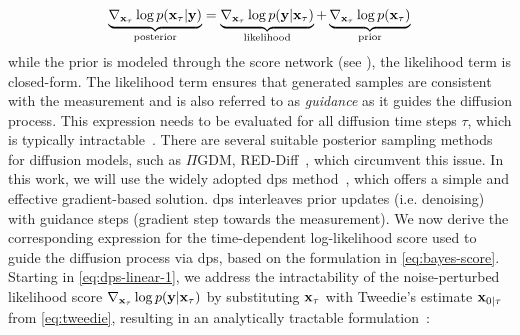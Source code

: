 \documentclass[journal,twoside,web,dvipsnames]{ieeecolor}          %
\begin{document}
\begin{equation}
    \underbrace{\nabla_{{\mathbf{x}}_\tau} \log p({\mathbf{x}}_\tau | {\mathbf{y}})}_{\text{posterior}} = \underbrace{\nabla_{{\mathbf{x}}_\tau} \log p({\mathbf{y}} | {\mathbf{x}}_\tau)}_{\text{likelihood}} + \underbrace{\nabla_{{\mathbf{x}}_\tau} \log p({\mathbf{x}}_\tau)}_{\text{prior}}
    \label{eq:bayes-score}
\end{equation}
while the prior is modeled through the score network (see ), the likelihood term is closed-form. The likelihood term ensures that generated samples are consistent with the measurement and is also referred to as \emph{guidance} as it guides the diffusion process. This expression needs to be evaluated for all diffusion time steps $\tau$, which is typically intractable~\cite{daras2024survey}. There are several suitable posterior sampling methods for diffusion models, such as $\Pi$GDM\cite{song2023pseudoinverseguided}, RED-Diff~\cite{mardani2023variational}, which circumvent this issue. In this work, we will use the widely adopted \acrfull{dps} method~\cite{chung2022diffusion}, which offers a simple and effective gradient-based solution. \Acrshort{dps} interleaves prior updates (i.e. denoising) with guidance steps (gradient step towards the measurement). We now derive the corresponding expression for the time-dependent log-likelihood score used to guide the diffusion process via \acrshort{dps}, based on the formulation in \eqref{eq:bayes-score}. Starting in \eqref{eq:dps-linear-1}, we address the intractability of the noise-perturbed likelihood score $\nabla_{{\mathbf{x}}_\tau} \log p({\mathbf{y}} | {\mathbf{x}}_\tau)$ by substituting ${\mathbf{x}}_\tau$ with Tweedie's estimate ${\mathbf{x}}_{0\mid\tau}$ from \eqref{eq:tweedie}, resulting in an analytically tractable formulation~\cite{chung2022diffusion, daras2024survey}:
\end{document}
